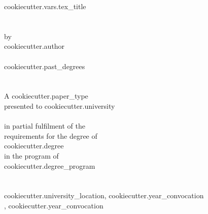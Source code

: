

\begin{titlepage}
\vspace*{\fill}
\centering

{{cookiecutter.vars.tex_title}} \\ ~ \\ ~ \\

by \\
{{cookiecutter.author}} \\ ~ \\
{{cookiecutter.past_degrees}} \\ ~ \\ ~ \\

A {{cookiecutter.paper_type}} \\
presented to {{cookiecutter.university}} \\ ~ \\
in partial fulfilment of the \\
requirements for the degree of \\
{{cookiecutter.degree}} \\
in the program of \\
{{cookiecutter.degree_program}} \\ ~ \\ ~ \\

{{cookiecutter.university_location}}, {{cookiecutter.year_convocation}} \\
, {{cookiecutter.year_convocation}}

\vspace*{\fill}
\end{titlepage}

